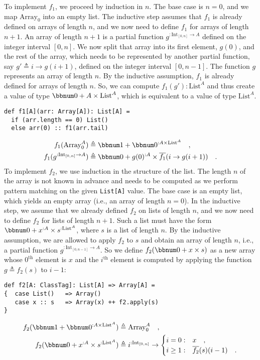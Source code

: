 To implement $f_{1}$, we proceed by induction in $n$. The base case
is $n=0$, and we map $\text{Array}_{0}$ into an empty list. The
inductive step assumes that $f_{1}$ is already defined on arrays
of length $n$, and we now need to define $f_{1}$ for arrays of length
$n+1$. An array of length $n+1$ is a partial function $g^{:\text{Int}_{[0,n]}\rightarrow A}$
defined on the integer interval $[0,n]$. We now split that array
into its first element, $g(0)$, and the rest of the array, which
needs to be represented by another partial function, say $g'\triangleq i\rightarrow g(i+1)$,
defined on the integer interval $[0,n-1]$. The function $g$ represents
an array of length $n$. By the inductive assumption, $f_{1}$ is
already defined for arrays of length $n$. So, we can compute $f_{1}(g'):\text{List}^{A}$
and thus create a value of type $\bbnum 0+A\times\text{List}^{A}$,
which is equivalent to a value of type $\text{List}^{A}$.
\begin{lstlisting}
def f1[A](arr: Array[A]): List[A] =
  if (arr.length == 0) List()
  else arr(0) :: f1(arr.tail)
\end{lstlisting}
\begin{align*}
f_{1}(\text{Array}_{0}^{A}) & \triangleq\bbnum 1+\bbnum 0^{:A\times\text{List}^{A}}\quad,\\
f_{1}(g^{:\text{Int}_{[0,n]}\rightarrow A}) & \triangleq\bbnum 0+g(0)^{:A}\times\overline{f_{1}}(i\rightarrow g(i+1))\quad.
\end{align*}
To implement $f_{2}$, we use induction in the structure of the list.
The length $n$ of the array is not known in advance and needs to
be computed as we perform pattern matching on the given \lstinline!List[A]!
value. The base case is an empty list, which yields an empty array
(i.e., an array of length $n=0$). In the inductive step, we assume
that we already defined $f_{2}$ on lists of length $n$, and we now
need to define $f_{2}$ for lists of length $n+1$. Such a list must
have the form $\bbnum 0+x^{:A}\times s^{:\text{List}^{A}}$, where
$s$ is a list of length $n$. By the inductive assumption, we are
allowed to apply $f_{2}$ to $s$ and obtain an array of length $n$,
i.e., a partial function $g^{:\text{Int}_{[0,n-1]}\rightarrow A}$.
So we define $f_{2}(\bbnum 0+x\times s)$ as a new array whose $0^{\text{th}}$
element is $x$ and the $i^{\text{th}}$ element is computed by applying
the function $g\triangleq f_{2}(s)$ to $i-1$:
\begin{lstlisting}
def f2[A: ClassTag]: List[A] => Array[A] =
{  case List()   => Array()
   case x :: s   => Array(x) ++ f2.apply(s)
}
\end{lstlisting}
\begin{align*}
f_{2}(\bbnum 1+\bbnum 0^{:A\times\text{List}^{A}}) & \triangleq\text{Array}_{0}^{A}\quad,\\
f_{2}(\bbnum 0+x^{:A}\times s^{:\text{List}^{A}}) & \triangleq i^{:\text{Int}_{[0,n]}}\rightarrow\begin{cases}
i=0: & x\quad,\\
i\geq1: & \overline{f_{2}}(s)(i-1)\quad.
\end{cases}
\end{align*}

